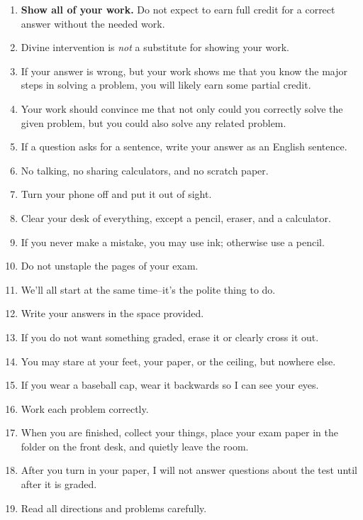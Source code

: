 \documentclass[12pt,fleqn]{exam}
\begin{document}
\noindent \begin{tcolorbox}
\begin{minipage}{6.5in}
\begin{enumerate}

\normalsize 
\item \textbf{Show all of your work.} Do not expect to earn full credit for a correct answer without the needed work.

\item Divine intervention is \emph{not} a substitute for showing your work.

\item If your answer is wrong, but your work shows me that you know the major steps in solving a problem, you will likely earn
some partial credit.

\item Your work should convince me that not only could you correctly solve the given 
problem, but you could also solve any related problem.

\item If a question asks for a sentence, write your answer as an English sentence. 

\item No talking, no sharing calculators, and no scratch paper.
\item  Turn your phone off and put it out of sight.
\item  Clear your desk of everything, except a pencil, eraser, and a calculator.
\item If you never make a mistake, you may use ink; otherwise use a pencil.
\item Do not unstaple the pages of your exam.
\item We'll all start at the same time--it's the polite thing to do.
\item Write your answers in the space provided. 
\item If you do not want something graded, erase it or clearly cross it out. 
\item You may stare at your feet, your paper, or the ceiling, but nowhere else. 
\item If you wear a  baseball cap, wear it backwards so I can see your eyes.
\item Work each problem correctly.
\item When you are finished, collect your things, place your exam paper in the folder on the front desk,
and quietly leave the room.
\item After you turn in your paper, I will not answer questions about the test until after it is graded.

\item Read all directions and problems carefully. 
\end{enumerate} 
\end{minipage} 

\end{tcolorbox}
\end{document}
